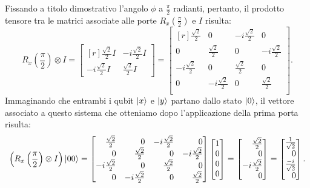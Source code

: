 \documentclass{book}
\theoremstyle{definition}
\theoremstyle{definition}
\theoremstyle{definition}
\theoremstyle{plain}
\theoremstyle{plain}
\theoremstyle{plain}
\theoremstyle{plain}
\begin{document}
Fissando a titolo dimostrativo l'angolo $\phi$ a $\frac{\pi}{2}$ radianti, pertanto, il prodotto tensore tra le matrici associate alle porte $R_x(\frac{\pi}{2})$ e $I$ risulta:
\begin{displaymath}
R_x\left(\frac{\pi}{2}\right) \otimes I = 
\begin{bmatrix*}[r]
\frac{\sqrt{2}}{2} I & -i \frac{\sqrt{2}}{2} I\\
-i \frac{\sqrt{2}}{2} I & \frac{\sqrt{2}}{2} I
\end{bmatrix*} =
\begin{bmatrix*}[r]
\frac{\sqrt{2}}{2} & 0 & -i \frac{\sqrt{2}}{2} & 0\\
0 & \frac{\sqrt{2}}{2} & 0 & -i \frac{\sqrt{2}}{2}\\
-i \frac{\sqrt{2}}{2} & 0 & \frac{\sqrt{2}}{2} & 0\\
0 & -i \frac{\sqrt{2}}{2} & 0 & \frac{\sqrt{2}}{2}\\
\end{bmatrix*} .
\end{displaymath}
Immaginando che entrambi i qubit $\ket{x}$ e $\ket{y}$ partano dallo stato $\ket{0}$, il vettore associato a questo sistema che otteniamo dopo l'applicazione della prima porta risulta:
\begin{displaymath}
\left( R_x\left(\frac{\pi}{2}\right) \otimes I \right) \ket{00} = 
\begin{bmatrix*}[r]
\frac{\sqrt{2}}{2} & 0 & -i \frac{\sqrt{2}}{2} & 0\\
0 & \frac{\sqrt{2}}{2} & 0 & -i \frac{\sqrt{2}}{2}\\
-i \frac{\sqrt{2}}{2} & 0 & \frac{\sqrt{2}}{2} & 0\\
0 & -i \frac{\sqrt{2}}{2} & 0 & \frac{\sqrt{2}}{2}\\
\end{bmatrix*}
\begin{bmatrix}
1\\
0\\
0\\
0
\end{bmatrix} = 
\begin{bmatrix*}[r]
\frac{\sqrt{2}}{2}\\
0\\
-i \frac{\sqrt{2}}{2}\\
0
\end{bmatrix*} = 
\begin{bmatrix*}[r]
\frac{1}{\sqrt{2}}\\
0\\
\frac{-i}{\sqrt{2}}\\
0
\end{bmatrix*} .
\end{displaymath}
\end{document}
